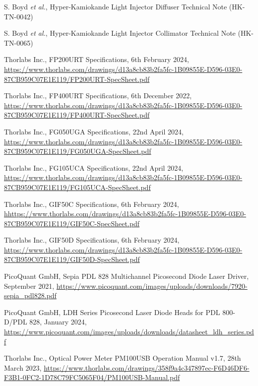 \documentclass[a4paper,11pt]{article}
\begin{document}
\newpage
\begin{thebibliography}{99}

S. Boyd {\it et al.}, Hyper-Kamiokande Light Injector Diffuser Technical Note (HK-TN-0042)

S. Boyd {\it et al.}, Hyper-Kamiokande Light Injector Collimator Technical Note (HK-TN-0065)

Thorlabs Inc., FP200URT Specifications, 6th February 2024, \url{https://www.thorlabs.com/drawings/d13a8cb83b2fa5fc-1B09855E-D596-03E0-87CB959C07E1E119/FP200URT-SpecSheet.pdf}

Thorlabs Inc., FP400URT Specifications, 6th December 2022, \url{https://www.thorlabs.com/drawings/d13a8cb83b2fa5fc-1B09855E-D596-03E0-87CB959C07E1E119/FP400URT-SpecSheet.pdf}

Thorlabs Inc., FG050UGA Specifications, 22nd April 2024, \url{https://www.thorlabs.com/drawings/d13a8cb83b2fa5fc-1B09855E-D596-03E0-87CB959C07E1E119/FG050UGA-SpecSheet.pdf}

Thorlabs Inc., FG105UCA Specifications, 22nd April 2024, \url{https://www.thorlabs.com/drawings/d13a8cb83b2fa5fc-1B09855E-D596-03E0-87CB959C07E1E119/FG105UCA-SpecSheet.pdf}

Thorlabs Inc., GIF50C Specifications, 6th February 2024, \url{hhttps://www.thorlabs.com/drawings/d13a8cb83b2fa5fc-1B09855E-D596-03E0-87CB959C07E1E119/GIF50C-SpecSheet.pdf}

Thorlabs Inc., GIF50D Specifications, 6th February 2024, \url{https://www.thorlabs.com/drawings/d13a8cb83b2fa5fc-1B09855E-D596-03E0-87CB959C07E1E119/GIF50D-SpecSheet.pdf}

PicoQuant GmbH, Sepia PDL 828 Multichannel Picosecond Diode Laser Driver, September 2021, \url{https://www.picoquant.com/images/uploads/downloads/7920-sepia_pdl828.pdf}

PicoQuant GmbH, LDH Series Picosecond Laser Diode Heads for PDL 800-D/PDL 828, January 2024, \url{https://www.picoquant.com/images/uploads/downloads/datasheet_ldh_series.pdf}

Thorlabs Inc., Optical Power Meter PM100USB Operation Manual v1.7, 28th March 2023, \url{https://www.thorlabs.com/drawings/358f9a4c347897ec-F6D46DF6-F3B1-0FC2-1D78C79FC5065F04/PM100USB-Manual.pdf}


\end{thebibliography}
\end{document}
